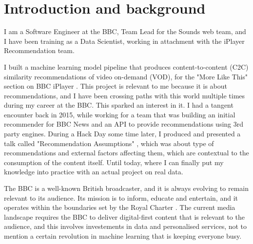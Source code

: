 
\section{Introduction and background}

I am a Software Engineer at the BBC, Team Lead for the Sounds web team, and I have been training as a Data Scientist,
working in attachment with the iPlayer Recommendation team.

I built a machine learning model pipeline that produces content-to-content (C2C) similarity recommendations
of video on-demand (VOD), for the "More Like This" section on BBC iPlayer \cite{MoreLikeBluey}.
This project is relevant to me because it is about recommendations, and I have been crossing paths with this world
multiple times during my career at the BBC. This sparked an interest in it.
I had a tangent encounter back in 2015, while working for a team that was building
an initial recommender for BBC News and an API to provide recommendations using 3rd party engines.
During a Hack Day some time later, I produced and presented a talk called
"Recommendation Assumptions" \cite{RecsAssumptions}, which was about type of recommendations and external factors affecting
them, which are contextual to the consumption of the content itself. Until today, where I can finally put my knowledge into practice
with an actual project on real data.

The BBC is a well-known British broadcaster, and it is always evolving to remain relevant to its audience. Its mission
is to inform, educate and entertain, and it operates within the boundaries set by the Royal Charter \cite{RoyalCharterBBC}.
The current media landscape requires the BBC to deliver digital-first content that is relevant to the audience,
and this involves investements in data and personalised services, not to mention a certain revolution in machine learning
that is keeping everyone busy.
